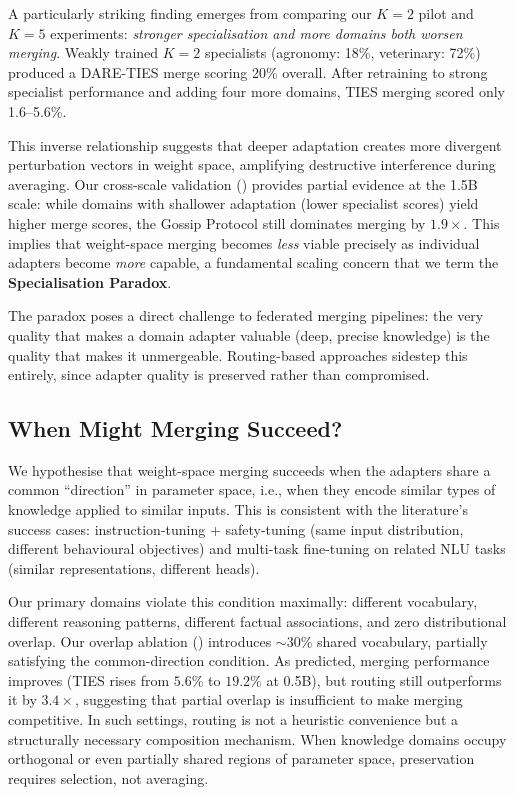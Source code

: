 \documentclass[conference, 10pt]{IEEEtran}
\begin{document}
A particularly striking finding emerges from comparing our $K=2$ pilot
and $K=5$ experiments:
\emph{stronger specialisation and more domains both worsen merging}.
Weakly trained $K=2$ specialists (agronomy: 18\%, veterinary: 72\%)
produced a DARE-TIES merge scoring 20\% overall.
After retraining to strong specialist performance and adding four more
domains, TIES merging scored only 1.6--5.6\%.

This inverse relationship suggests that deeper adaptation creates
more divergent perturbation vectors in weight space, amplifying
destructive interference during averaging.
Our cross-scale validation () provides partial
evidence at the 1.5B scale: while domains with shallower adaptation
(lower specialist scores) yield higher merge scores, the Gossip
Protocol still dominates merging by $1.9\times$.
This implies that weight-space merging becomes \emph{less} viable
precisely as individual adapters become \emph{more} capable, a
fundamental scaling concern that we term the
\textbf{Specialisation Paradox}.

The paradox poses a direct challenge to federated merging pipelines:
the very quality that makes a domain adapter valuable (deep, precise
knowledge) is the quality that makes it unmergeable.
Routing-based approaches sidestep this entirely, since adapter
quality is preserved rather than compromised.

\subsection{When Might Merging Succeed?}

We hypothesise that weight-space merging succeeds when the adapters
share a common ``direction'' in parameter space, i.e., when they encode
similar types of knowledge applied to similar inputs.
This is consistent with the literature's success cases:
instruction-tuning + safety-tuning (same input distribution, different
behavioural objectives) and multi-task fine-tuning on related NLU tasks
(similar representations, different heads).

Our primary domains violate this condition maximally: different
vocabulary, different reasoning patterns, different factual
associations, and zero distributional overlap.
Our overlap ablation () introduces
$\sim$30\% shared vocabulary, partially satisfying the common-direction
condition. As predicted, merging performance improves (TIES rises
from $5.6\%$ to $19.2\%$ at 0.5B), but routing still outperforms
it by $3.4\times$, suggesting that partial overlap is insufficient
to make merging competitive.
In such settings, routing is not a heuristic convenience but a
structurally necessary composition mechanism.
When knowledge domains occupy orthogonal or even partially shared
regions of parameter space, preservation requires selection, not
averaging.
\end{document}
